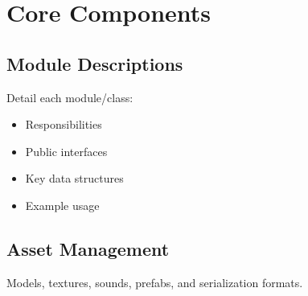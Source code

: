 \chapter{Core Components}
\section{Module Descriptions}
Detail each module/class:
\begin{itemize}
    \item Responsibilities
    \item Public interfaces
    \item Key data structures
    \item Example usage
\end{itemize}

\section{Asset Management}
Models, textures, sounds, prefabs, and serialization formats.